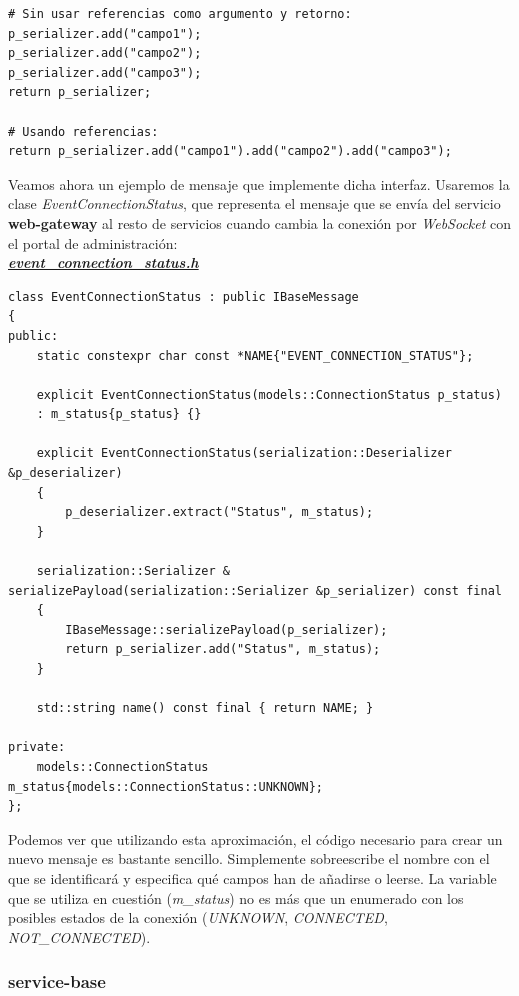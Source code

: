 \begin{lstlisting}
# Sin usar referencias como argumento y retorno:	
p_serializer.add("campo1");	
p_serializer.add("campo2");	
p_serializer.add("campo3");
return p_serializer;

# Usando referencias:
return p_serializer.add("campo1").add("campo2").add("campo3");
\end{lstlisting}

Veamos ahora un ejemplo de mensaje que implemente dicha interfaz. Usaremos la clase \textit{EventConnectionStatus}, que representa el mensaje que se envía del servicio \textbf{web-gateway} al resto de servicios cuando cambia la conexión por \textit{WebSocket} con el portal de administración:\\

\textbf{\textit{\href{https://github.com/adrianmorente/lazarillo-embedded/blob/master/messages-definition/inc/messages-definition/event_connection_status.h}{event\_connection\_status.h}}}
\begin{lstlisting}
class EventConnectionStatus : public IBaseMessage
{
public:
	static constexpr char const *NAME{"EVENT_CONNECTION_STATUS"};
	
	explicit EventConnectionStatus(models::ConnectionStatus p_status)
	: m_status{p_status} {}
	
	explicit EventConnectionStatus(serialization::Deserializer &p_deserializer)
	{
		p_deserializer.extract("Status", m_status);
	}
	
	serialization::Serializer & serializePayload(serialization::Serializer &p_serializer) const final
	{
		IBaseMessage::serializePayload(p_serializer);
		return p_serializer.add("Status", m_status);
	}
	
	std::string name() const final { return NAME; }
	
private:
	models::ConnectionStatus m_status{models::ConnectionStatus::UNKNOWN};
};
\end{lstlisting}

Podemos ver que utilizando esta aproximación, el código necesario para crear un nuevo mensaje es bastante sencillo. Simplemente sobreescribe el nombre con el que se identificará y especifica qué campos han de añadirse o leerse. La variable que se utiliza en cuestión (\emph{m\_status}) no es más que un enumerado con los posibles estados de la conexión (\emph{UNKNOWN}, \emph{CONNECTED}, \emph{NOT\_CONNECTED}).


\subsubsection{service-base}

